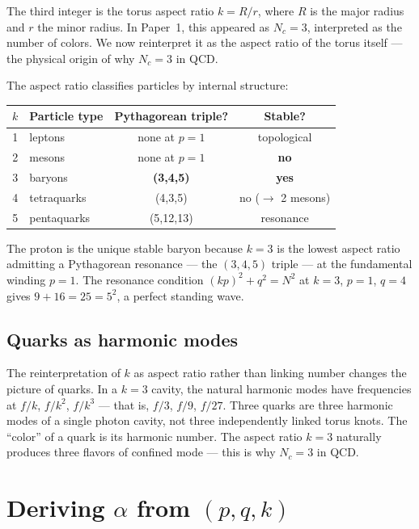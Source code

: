 \documentclass[11pt,a4paper]{article}
\begin{document}
The third integer is the torus aspect ratio $k = R/r$, where $R$ is the major radius and $r$ the minor radius. In Paper~1, this appeared as $N_c = 3$, interpreted as the number of colors. We now reinterpret it as the aspect ratio of the torus itself --- the physical origin of why $N_c = 3$ in QCD.

The aspect ratio classifies particles by internal structure:

\begin{table}[h]
\centering
\begin{tabular}{@{}clcc@{}}
\toprule
$k$ & Particle type & Pythagorean triple? & Stable? \\
\midrule
1 & leptons & none at $p=1$ & topological \\
2 & mesons & none at $p=1$ & \textbf{no} \\
3 & baryons & \textbf{(3,4,5)} & \textbf{yes} \\
4 & tetraquarks & (4,3,5) & no ($\to$ 2 mesons) \\
5 & pentaquarks & (5,12,13) & resonance \\
\bottomrule
\end{tabular}
\end{table}

The proton is the unique stable baryon because $k=3$ is the lowest aspect ratio admitting a Pythagorean resonance --- the $(3,4,5)$ triple --- at the fundamental winding $p=1$. The resonance condition $(kp)^2 + q^2 = N^2$ at $k=3$, $p=1$, $q=4$ gives $9 + 16 = 25 = 5^2$, a perfect standing wave.

\subsection{Quarks as harmonic modes}

The reinterpretation of $k$ as aspect ratio rather than linking number changes the picture of quarks. In a $k=3$ cavity, the natural harmonic modes have frequencies at $f/k$, $f/k^2$, $f/k^3$ --- that is, $f/3$, $f/9$, $f/27$. Three quarks are three harmonic modes of a single photon cavity, not three independently linked torus knots. The ``color'' of a quark is its harmonic number. The aspect ratio $k=3$ naturally produces three flavors of confined mode --- this is why $N_c = 3$ in QCD.

\section{Deriving $\alpha$ from $(p, q, k)$}
\label{sec:alpha}
\end{document}

